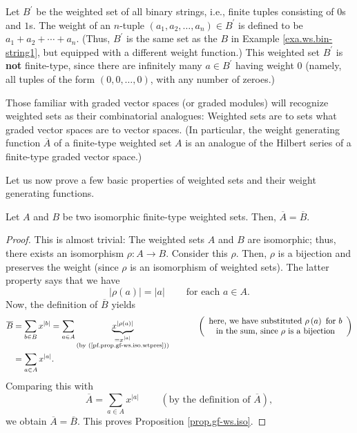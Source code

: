 \begin{example}
Let $B^{\prime}$ be the weighted set of all binary strings, i.e., finite
tuples consisting of $0$s and $1$s. The weight of an $n$-tuple $\left(
a_{1},a_{2},\ldots,a_{n}\right)  \in B^{\prime}$ is defined to be $a_{1}%
+a_{2}+\cdots+a_{n}$. (Thus, $B^{\prime}$ is the same set as the $B$ in
Example \ref{exa.ws.bin-string1}, but equipped with a different weight
function.) This weighted set $B^{\prime}$ is \textbf{not} finite-type, since
there are infinitely many $a\in B^{\prime}$ having weight $0$ (namely, all
tuples of the form $\left(  0,0,\ldots,0\right)  $, with any number of zeroes.)
\end{example}

Those familiar with graded vector spaces (or graded modules) will recognize
weighted sets as their combinatorial analogues: Weighted sets are to sets what
graded vector spaces are to vector spaces. (In particular, the weight
generating function $\overline{A}$ of a finite-type weighted set $A$ is an
analogue of the Hilbert series of a finite-type graded vector space.) \medskip

Let us now prove a few basic properties of weighted sets and their weight
generating functions.

\begin{proposition}
\label{prop.gf-ws.iso}Let $A$ and $B$ be two isomorphic finite-type weighted
sets. Then, $\overline{A}=\overline{B}$.
\end{proposition}

\begin{proof}
This is almost trivial: The weighted sets $A$ and $B$ are isomorphic; thus,
there exists an isomorphism $\rho:A\rightarrow B$. Consider this $\rho$. Then,
$\rho$ is a bijection and preserves the weight (since $\rho$ is an isomorphism
of weighted sets). The latter property says that we have
\begin{equation}
\left\vert \rho\left(  a\right)  \right\vert =\left\vert a\right\vert
\ \ \ \ \ \ \ \ \ \ \text{for each }a\in A. \label{pf.prop.gf-ws.iso.wtpres}%
\end{equation}
Now, the definition of $\overline{B}$ yields%
\begin{align*}
\overline{B}  &  =\sum_{b\in B}x^{\left\vert b\right\vert }=\sum_{a\in
A}\underbrace{x^{\left\vert \rho\left(  a\right)  \right\vert }}%
_{\substack{=x^{\left\vert a\right\vert }\\\text{(by
(\ref{pf.prop.gf-ws.iso.wtpres}))}}}\ \ \ \ \ \ \ \ \ \ \left(
\begin{array}
[c]{c}%
\text{here, we have substituted }\rho\left(  a\right)  \text{ for }b\\
\text{in the sum, since }\rho\text{ is a bijection}%
\end{array}
\right) \\
&  =\sum_{a\in A}x^{\left\vert a\right\vert }.
\end{align*}
Comparing this with%
\[
\overline{A}=\sum_{a\in A}x^{\left\vert a\right\vert }%
\ \ \ \ \ \ \ \ \ \ \left(  \text{by the definition of }\overline{A}\right)
,
\]
we obtain $\overline{A}=\overline{B}$. This proves Proposition
\ref{prop.gf-ws.iso}.
\end{proof}

